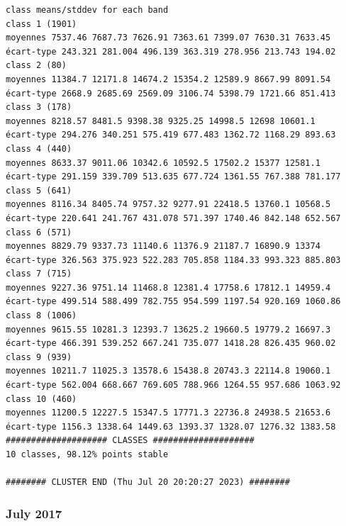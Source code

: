 \documentclass[land,article,submit,pdftex,moreauthors]{Definitions/mdpi}
\begin{document}
\begin{scriptsize}
\begin{verbatim}
class means/stddev for each band
class 1 (1901)
moyennes 7537.46 7687.73 7626.91 7363.61 7399.07 7630.31 7633.45
écart-type 243.321 281.004 496.139 363.319 278.956 213.743 194.02
class 2 (80)
moyennes 11384.7 12171.8 14674.2 15354.2 12589.9 8667.99 8091.54
écart-type 2668.9 2685.69 2569.09 3106.74 5398.79 1721.66 851.413
class 3 (178)
moyennes 8218.57 8481.5 9398.38 9325.25 14998.5 12698 10601.1
écart-type 294.276 340.251 575.419 677.483 1362.72 1168.29 893.63
class 4 (440)
moyennes 8633.37 9011.06 10342.6 10592.5 17502.2 15377 12581.1
écart-type 291.159 339.709 513.635 677.724 1361.55 767.388 781.177
class 5 (641)
moyennes 8116.34 8405.74 9757.32 9277.91 22418.5 13760.1 10568.5
écart-type 220.641 241.767 431.078 571.397 1740.46 842.148 652.567
class 6 (571)
moyennes 8829.79 9337.73 11140.6 11376.9 21187.7 16890.9 13374
écart-type 326.563 375.923 522.283 705.858 1184.33 993.323 885.803
class 7 (715)
moyennes 9227.36 9751.14 11468.8 12381.4 17758.6 17812.1 14959.4
écart-type 499.514 588.499 782.755 954.599 1197.54 920.169 1060.86
class 8 (1006)
moyennes 9615.55 10281.3 12393.7 13625.2 19660.5 19779.2 16697.3
écart-type 466.391 539.252 667.241 735.077 1418.28 826.435 960.02
class 9 (939)
moyennes 10211.7 11025.3 13578.6 15438.8 20743.3 22114.8 19060.1
écart-type 562.004 668.667 769.605 788.966 1264.55 957.686 1063.92
class 10 (460)
moyennes 11200.5 12227.5 15347.5 17771.3 22736.8 24938.5 21653.6
écart-type 1156.3 1338.64 1449.63 1393.37 1328.07 1276.32 1383.58
#################### CLASSES ####################
10 classes, 98.12% points stable

######## CLUSTER END (Thu Jul 20 20:20:27 2023) ########
\end{verbatim}
\end{scriptsize}

\subsubsection[\appendixname~\thesubsubsection]{July 2017}
\end{document}
